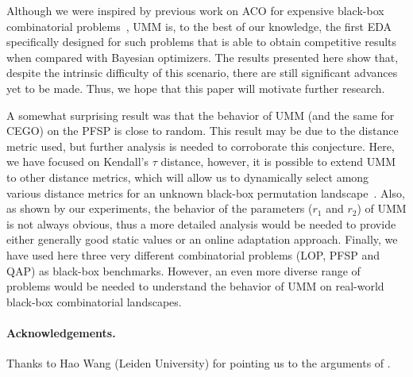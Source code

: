 \documentclass[runningheads]{llncs}
\begin{document}
Although we were inspired by previous work on ACO for expensive black-box
combinatorial problems~\citep{PerLopStu2015si}, UMM is, to the best of our
knowledge, the first EDA specifically designed for such problems that is able
to obtain competitive results when compared with Bayesian optimizers. The
results presented here show that, despite the intrinsic difficulty of this scenario, there are still significant advances yet to be made. Thus, we hope
that this paper will motivate further research. %

A somewhat surprising result was that the behavior of UMM (and the same for
CEGO) on the PFSP is close to random. This result may be due to the distance
metric used, but further analysis is needed to corroborate this
conjecture. Here, we have focused on Kendall's $\tau$ distance, however, it is
possible to extend UMM to other distance metrics, which will allow us to
dynamically select among various distance metrics for an unknown black-box
permutation landscape~\citep{ZaeStoBar2014:ppsn}. Also, as shown by our
experiments, the behavior of the parameters ($r_1$ and $r_2$) of UMM is not
always obvious, thus a more detailed analysis would be needed to provide either
generally good static values or an online adaptation approach. Finally, we have
used here three very different combinatorial problems (LOP, PFSP and QAP) as
black-box benchmarks. However, an even more diverse range of problems would be
needed to understand the behavior of UMM on real-world black-box combinatorial
landscapes.



\begin{smaller}
\paragraph*{Acknowledgements.}
%
Thanks to Hao Wang (Leiden University) for pointing us to the arguments of
\citet{EriPeaGar2019scalable}.
\end{smaller}



\renewcommand{\doi}[1]{doi:\hspace{.16667em plus .08333em}\discretionary{}{}{}\href{https://doi.org/#1}{\urlstyle{rm}\nolinkurl{#1}}}


\end{document}
